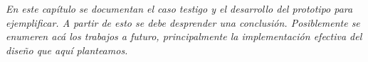 
\textit{En este capítulo se documentan el caso testigo y el desarrollo del prototipo para ejemplificar. A partir de esto se debe desprender una conclusión. Posiblemente se enumeren acá los trabajos a futuro, principalmente la implementación efectiva del diseño que aquí planteamos.}
